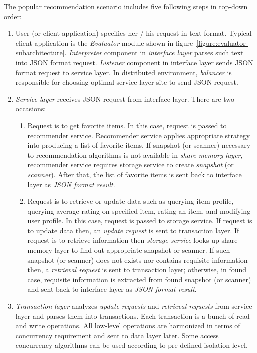 \documentclass[a4paper,twoside]{article}
\begin{document}
The popular recommendation scenario includes five following steps in top-down order:
\begin{enumerate}
\item User (or client application) specifies her / his request in text format. Typical client application is the \textit{Evaluator} module shown in figure~\ref{figure:evaluator-subarchitecture}. \textit{Interpreter} component in \textit{interface layer} parses such text into JSON format request. \textit{Listener} component in interface layer sends JSON format request to service layer. In distributed environment, \textit{balancer} is responsible for choosing optimal service layer site to send JSON request.
\item \textit{Service layer} receives JSON request from interface layer. There are two occasions:
  \begin{enumerate}
  \item Request is to get favorite items. In this case, request is passed to recommender service. Recommender service applies appropriate strategy into producing a list of favorite items. If snapshot (or scanner) necessary to recommendation algorithms is not available in \textit{share memory layer}, recommender service requires storage service to create \textit{snapshot} (or \textit{scanner}). After that, the list of favorite items is sent back to interface layer as \textit{JSON format result}.
  \item Request is to retrieve or update data such as querying item profile, querying average rating on specified item, rating an item, and modifying user profile. In this case, request is passed to storage service. If request is to update data then, an \textit{update request} is sent to transaction layer. If request is to retrieve information then \textit{storage service} looks up share memory layer to find out appropriate snapshot or scanner. If such snapshot (or scanner) does not exists nor contains requisite information then, a \textit{retrieval request} is sent to transaction layer; otherwise, in found case, requisite information is extracted from found snapshot (or scanner) and sent back to interface layer as \textit{JSON format result}.
  \end{enumerate}
\item \textit{Transaction layer} analyzes \textit{update requests} and \textit{retrieval requests} from service layer and parses them into transactions. Each transaction is a bunch of read and write operations. All low-level operations are harmonized in terms of concurrency requirement and sent to data layer later. Some access concurrency algorithms can be used according to pre-defined isolation level.

\end{enumerate}
\end{document}

